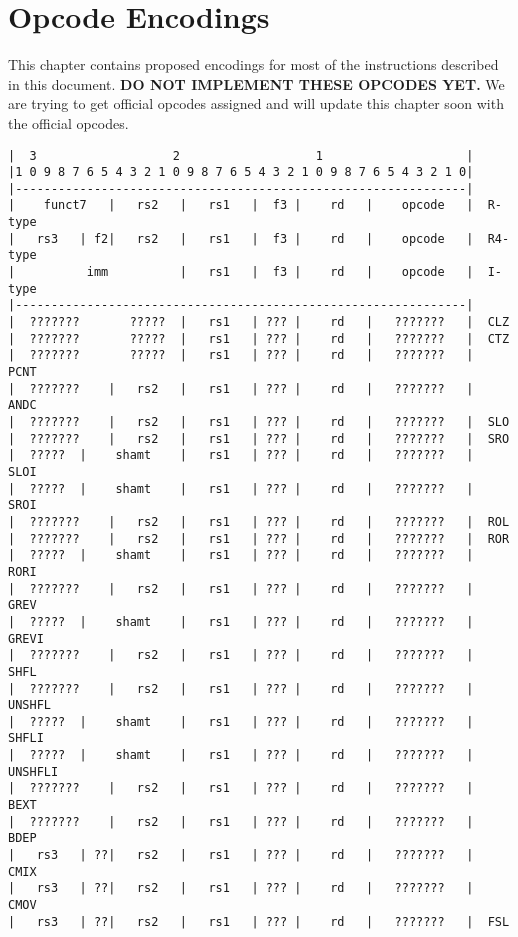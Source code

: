 \chapter{Opcode Encodings}
\label{opcodes}

This chapter contains proposed encodings for most of the instructions described
in this document. {\bf DO NOT IMPLEMENT THESE OPCODES YET.} We are trying to get
official opcodes assigned and will update this chapter soon with the official
opcodes.

\begin{verbatim}
|  3                   2                   1                    |
|1 0 9 8 7 6 5 4 3 2 1 0 9 8 7 6 5 4 3 2 1 0 9 8 7 6 5 4 3 2 1 0|
|---------------------------------------------------------------|
|    funct7   |   rs2   |   rs1   |  f3 |    rd   |    opcode   |  R-type
|   rs3   | f2|   rs2   |   rs1   |  f3 |    rd   |    opcode   |  R4-type
|          imm          |   rs1   |  f3 |    rd   |    opcode   |  I-type
|---------------------------------------------------------------|
|  ???????       ?????  |   rs1   | ??? |    rd   |   ???????   |  CLZ
|  ???????       ?????  |   rs1   | ??? |    rd   |   ???????   |  CTZ
|  ???????       ?????  |   rs1   | ??? |    rd   |   ???????   |  PCNT
|  ???????    |   rs2   |   rs1   | ??? |    rd   |   ???????   |  ANDC
|  ???????    |   rs2   |   rs1   | ??? |    rd   |   ???????   |  SLO
|  ???????    |   rs2   |   rs1   | ??? |    rd   |   ???????   |  SRO
|  ?????  |    shamt    |   rs1   | ??? |    rd   |   ???????   |  SLOI
|  ?????  |    shamt    |   rs1   | ??? |    rd   |   ???????   |  SROI
|  ???????    |   rs2   |   rs1   | ??? |    rd   |   ???????   |  ROL
|  ???????    |   rs2   |   rs1   | ??? |    rd   |   ???????   |  ROR
|  ?????  |    shamt    |   rs1   | ??? |    rd   |   ???????   |  RORI
|  ???????    |   rs2   |   rs1   | ??? |    rd   |   ???????   |  GREV
|  ?????  |    shamt    |   rs1   | ??? |    rd   |   ???????   |  GREVI
|  ???????    |   rs2   |   rs1   | ??? |    rd   |   ???????   |  SHFL
|  ???????    |   rs2   |   rs1   | ??? |    rd   |   ???????   |  UNSHFL
|  ?????  |    shamt    |   rs1   | ??? |    rd   |   ???????   |  SHFLI
|  ?????  |    shamt    |   rs1   | ??? |    rd   |   ???????   |  UNSHFLI
|  ???????    |   rs2   |   rs1   | ??? |    rd   |   ???????   |  BEXT
|  ???????    |   rs2   |   rs1   | ??? |    rd   |   ???????   |  BDEP
|   rs3   | ??|   rs2   |   rs1   | ??? |    rd   |   ???????   |  CMIX
|   rs3   | ??|   rs2   |   rs1   | ??? |    rd   |   ???????   |  CMOV
|   rs3   | ??|   rs2   |   rs1   | ??? |    rd   |   ???????   |  FSL

\end{verbatim}
